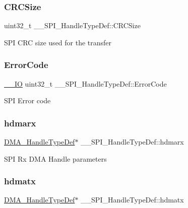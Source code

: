 \subsubsection{\texorpdfstring{CRCSize}{CRCSize}}
{\footnotesize\ttfamily uint32\+\_\+t \+\_\+\+\_\+\+S\+P\+I\+\_\+\+Handle\+Type\+Def\+::\+C\+R\+C\+Size}

S\+PI C\+RC size used for the transfer \mbox{\label{struct_____s_p_i___handle_type_def_ab2497f2e3cfae59376db75da3bda7ffe}} 
\subsubsection{\texorpdfstring{ErrorCode}{ErrorCode}}
{\footnotesize\ttfamily \mbox{\hyperlink{core__sc300_8h_aec43007d9998a0a0e01faede4133d6be}{\+\_\+\+\_\+\+IO}} uint32\+\_\+t \+\_\+\+\_\+\+S\+P\+I\+\_\+\+Handle\+Type\+Def\+::\+Error\+Code}

S\+PI Error code \mbox{\label{struct_____s_p_i___handle_type_def_a0876a1b344524bbdbd984be1c3b07a10}} 
\subsubsection{\texorpdfstring{hdmarx}{hdmarx}}
{\footnotesize\ttfamily \mbox{\hyperlink{group___d_m_a___exported___types_ga41b754a906b86bce54dc79938970138b}{D\+M\+A\+\_\+\+Handle\+Type\+Def}}$\ast$ \+\_\+\+\_\+\+S\+P\+I\+\_\+\+Handle\+Type\+Def\+::hdmarx}

S\+PI Rx D\+MA Handle parameters \mbox{\label{struct_____s_p_i___handle_type_def_aa311e9419f520aee2d2fa30668ce485c}} 
\subsubsection{\texorpdfstring{hdmatx}{hdmatx}}
{\footnotesize\ttfamily \mbox{\hyperlink{group___d_m_a___exported___types_ga41b754a906b86bce54dc79938970138b}{D\+M\+A\+\_\+\+Handle\+Type\+Def}}$\ast$ \+\_\+\+\_\+\+S\+P\+I\+\_\+\+Handle\+Type\+Def\+::hdmatx}

